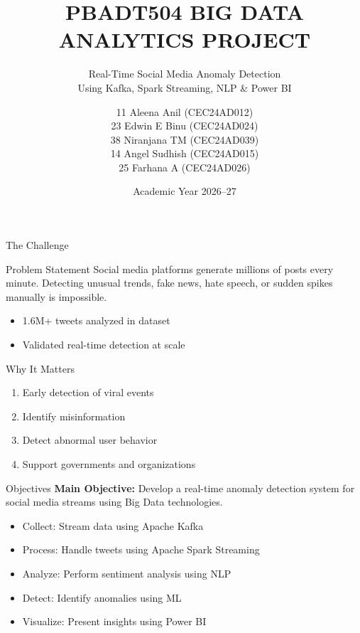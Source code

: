 \documentclass[aspectratio=169]{beamer}
\title{\small PBADT504 BIG DATA ANALYTICS PROJECT}
\subtitle{\Huge Real-Time Social Media Anomaly Detection \\ \large Using Kafka, Spark Streaming, NLP \& Power BI}
\author{
11 Aleena Anil (CEC24AD012) \\
23 Edwin E Binu (CEC24AD024) \\
38 Niranjana TM (CEC24AD039) \\
14 Angel Sudhish (CEC24AD015) \\
25 Farhana A (CEC24AD026)
}
\institute{College of Engineering Cherthala}
\date{Academic Year 2026--27}
\begin{document}
\frame{\titlepage}

\begin{frame}{The Challenge}
\begin{block}{Problem Statement}
Social media platforms generate millions of posts every minute.
Detecting unusual trends, fake news, hate speech, or sudden spikes manually is impossible.
\end{block}

\begin{itemize}
    \item 1.6M+ tweets analyzed in dataset
    \item Validated real-time detection at scale
\end{itemize}
\end{frame}

\begin{frame}{Why It Matters}
\begin{enumerate}
    \item Early detection of viral events
    \item Identify misinformation
    \item Detect abnormal user behavior
    \item Support governments and organizations
\end{enumerate}
\end{frame}

\begin{frame}{Objectives}
\textbf{Main Objective:} Develop a real-time anomaly detection system for social media streams using Big Data technologies.

\begin{itemize}
    \item Collect: Stream data using Apache Kafka
    \item Process: Handle tweets using Apache Spark Streaming
    \item Analyze: Perform sentiment analysis using NLP
    \item Detect: Identify anomalies using ML
    \item Visualize: Present insights using Power BI
\end{itemize}
\end{frame}
\end{document}

